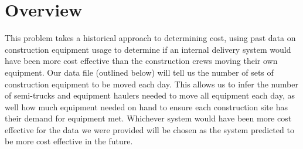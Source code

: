 \documentclass[letterpaper,10pt,english]{sphinxmanual}
\begin{document}
\section{Overview}
\label{\detokenize{main:overview}}
This problem takes a historical approach to determining cost, using past data
on construction equipment usage to determine if an internal delivery system
would have been more cost effective than the construction crews moving their
own equipment. Our data file (outlined below) will tell us the number of sets
of construction equipment to be moved each day. This allows us to infer the
number of semi-trucks and equipment haulers needed to move all equipment each
day, as well how much equipment needed on hand to ensure each construction
site has their demand for equipment met. Whichever system would have been
more cost effective for the data we were provided will be chosen as the
system predicted to be more cost effective in the future.
\end{document}
